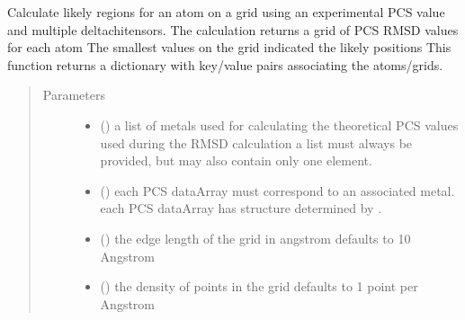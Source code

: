 \documentclass[a4paper,10pt,english,openany,oneside]{sphinxmanual}
\begin{document}
\begin{fulllineitems}
\label{\detokenize{reference/generated/paramagpy.fit.gridsearch_fit_atom_from_pcs:paramagpy.fit.gridsearch_fit_atom_from_pcs}}
\sphinxAtStartPar
Calculate likely regions for an atom on a grid using
an experimental PCS value and multiple delta\sphinxhyphen{}chi\sphinxhyphen{}tensors.
The calculation returns a grid of PCS RMSD values for each atom
The smallest values on the grid indicated the likely positions
This function returns a dictionary with key/value pairs
associating the atoms/grids.
\begin{quote}\begin{description}
\item[{Parameters}] \leavevmode\begin{itemize}
\item {} 
\sphinxAtStartPar
{} () \textendash{} a list of metals used for calculating the theoretical
PCS values used during the RMSD calculation
a list must always be provided, but may also contain
only one element.

\item {} 
\sphinxAtStartPar
{} () \textendash{} each PCS dataArray must correspond to an associated metal.
each PCS dataArray has structure determined by
{\hyperref[\detokenize{reference/generated/paramagpy.protein.CustomStructure.parse:paramagpy.protein.CustomStructure.parse}]{}}.

\item {} 
\sphinxAtStartPar
{} (\sphinxstyleliteralemphasis{\sphinxupquote{, }}) \textendash{} the edge length of the grid in angstrom
defaults to 10 Angstrom

\item {} 
\sphinxAtStartPar
{} (\sphinxstyleliteralemphasis{\sphinxupquote{, }}) \textendash{} the density of points in the grid
defaults to 1 point per Angstrom


\end{itemize}
\end{description}
\end{quote}
\end{fulllineitems}
\end{document}
